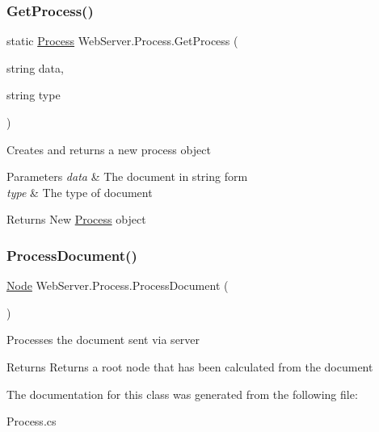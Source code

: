 \subsubsection{\texorpdfstring{Get\+Process()}{GetProcess()}}
{\footnotesize\ttfamily static \hyperlink{class_web_server_1_1_process}{Process} Web\+Server.\+Process.\+Get\+Process (\begin{DoxyParamCaption}\item[{string}]{data,  }\item[{string}]{type }\end{DoxyParamCaption})\hspace{0.3cm}{\ttfamily [static]}}



Creates and returns a new process object 


\begin{DoxyParams}{Parameters}
{\em data} & The document in string form\\
\hline
{\em type} & The type of document\\
\hline
\end{DoxyParams}
\begin{DoxyReturn}{Returns}
New \hyperlink{class_web_server_1_1_process}{Process} object
\end{DoxyReturn}
\mbox{\label{class_web_server_1_1_process_a1e01d70b31479a65280fbfbab855861b}} 
\subsubsection{\texorpdfstring{Process\+Document()}{ProcessDocument()}}
{\footnotesize\ttfamily \hyperlink{class_web_server_1_1_node}{Node} Web\+Server.\+Process.\+Process\+Document (\begin{DoxyParamCaption}{ }\end{DoxyParamCaption})}



Processes the document sent via server 

\begin{DoxyReturn}{Returns}
Returns a root node that has been calculated from the document
\end{DoxyReturn}


The documentation for this class was generated from the following file\+:\begin{DoxyCompactItemize}
\item 
Process.\+cs\end{DoxyCompactItemize}
